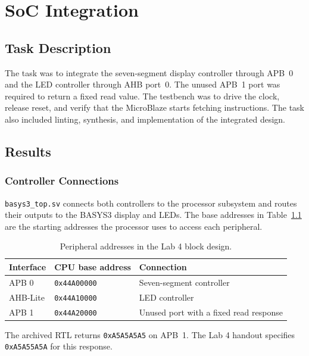 \chapter{SoC Integration}

\section{Task Description}

The task was to integrate the seven-segment display controller through APB~0
and the LED controller through AHB port~0. The unused APB~1 port was required
to return a fixed read value. The testbench was to drive the clock, release
reset, and verify that the MicroBlaze starts fetching instructions. The task
also included linting, synthesis, and implementation of the integrated design.

\section{Results}

\subsection{Controller Connections}

\texttt{basys3\_top.sv} connects both controllers to the processor subsystem
and routes their outputs to the BASYS3 display and LEDs. The base addresses
in Table~\ref{tab:address-map} are the starting addresses the processor uses
to access each peripheral.

\begin{table}[!htb]
  \centering
  \begin{tabular}{@{}lll@{}}
    \toprule
    Interface & CPU base address & Connection \\
    \midrule
    APB 0 & \texttt{0x44A00000} & Seven-segment controller \\
    AHB-Lite & \texttt{0x44A10000} & LED controller \\
    APB 1 & \texttt{0x44A20000} & Unused port with a fixed read response \\
    \bottomrule
  \end{tabular}
  \caption{Peripheral addresses in the Lab 4 block design.}
  \label{tab:address-map}
\end{table}

The archived RTL returns \texttt{0xA5A5A5A5} on APB~1. The Lab 4 handout
specifies \texttt{0xA5A55A5A} for this response.

